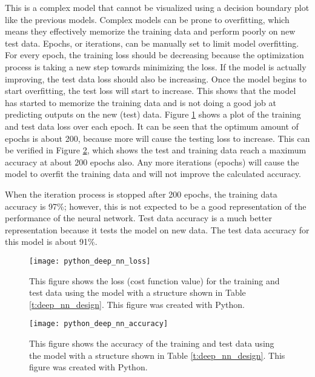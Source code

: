 This is a complex model that cannot be visualized using a decision boundary plot like the previous models.  Complex models can be prone to overfitting, which means they effectively memorize the training data and perform poorly on new test data.  Epochs, or iterations, can be manually set to limit model overfitting.  For every epoch, the training loss should be decreasing because the optimization process is taking a new step towards minimizing the loss.  If the model is actually improving, the test data loss should also be increasing.  Once the model begins to start overfitting, the test loss will start to increase.  This shows that the model has started to memorize the training data and is not doing a good job at predicting outputs on the new (test) data.  Figure \ref{fig:python_deep_nn_loss} shows a plot of the training and test data loss over each epoch.  It can be seen that the optimum amount of epochs is about 200, because more will cause the testing loss to increase.  This can be verified in Figure \ref{fig:python_deep_nn_accuracy}, which shows the test and training data reach a maximum accuracy at about 200 epochs also.  Any more iterations (epochs) will cause the model to overfit the training data and will not improve the calculated accuracy.

When the iteration process is stopped after 200 epochs, the training data accuracy is 97\%; however, this is not expected to be a good representation of the performance of the neural network.  Test data accuracy is a much better representation because it tests the model on new data.  The test data accuracy for this model is about 91\%.

\begin{figure}
\centering
\texttt{[image: python\_deep\_nn\_loss]}
\decoRule
\caption{This figure shows the loss (cost function value) for the training and test data using the model with a structure shown in Table \ref{t:deep_nn_design}.  This figure was created with Python.}
\label{fig:python_deep_nn_loss}
\end{figure}

\begin{figure}
\centering
\texttt{[image: python\_deep\_nn\_accuracy]}
\decoRule
\caption{This figure shows the accuracy of the training and test data using the model with a structure shown in Table \ref{t:deep_nn_design}. This figure was created with Python.}
\label{fig:python_deep_nn_accuracy}
\end{figure}

